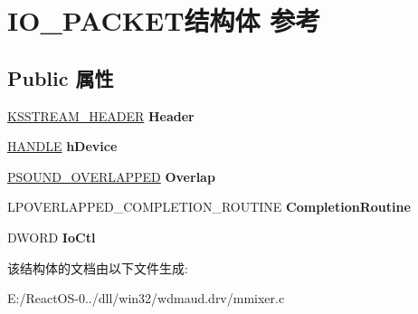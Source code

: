 \hypertarget{struct_i_o___p_a_c_k_e_t}{}\section{I\+O\+\_\+\+P\+A\+C\+K\+E\+T结构体 参考}
\label{struct_i_o___p_a_c_k_e_t}
\subsection*{Public 属性}
\begin{DoxyCompactItemize}
\item 
\mbox{\label{struct_i_o___p_a_c_k_e_t_a23caf1ce67d13972c6a9f560380cafda}} 
\hyperlink{struct_k_s_s_t_r_e_a_m___h_e_a_d_e_r}{K\+S\+S\+T\+R\+E\+A\+M\+\_\+\+H\+E\+A\+D\+ER} {\bfseries Header}
\item 
\mbox{\label{struct_i_o___p_a_c_k_e_t_adc99eabee6f837022c012760d936e987}} 
\hyperlink{interfacevoid}{H\+A\+N\+D\+LE} {\bfseries h\+Device}
\item 
\mbox{\label{struct_i_o___p_a_c_k_e_t_a8a1658598c874e3c382389cec48521f5}} 
\hyperlink{struct___s_o_u_n_d___o_v_e_r_l_a_p_p_e_d}{P\+S\+O\+U\+N\+D\+\_\+\+O\+V\+E\+R\+L\+A\+P\+P\+ED} {\bfseries Overlap}
\item 
\mbox{\label{struct_i_o___p_a_c_k_e_t_a98625b87253b42435862f7542ccb068c}} 
L\+P\+O\+V\+E\+R\+L\+A\+P\+P\+E\+D\+\_\+\+C\+O\+M\+P\+L\+E\+T\+I\+O\+N\+\_\+\+R\+O\+U\+T\+I\+NE {\bfseries Completion\+Routine}
\item 
\mbox{\label{struct_i_o___p_a_c_k_e_t_a00439e8ca78fd3a1f550721e1238864a}} 
D\+W\+O\+RD {\bfseries Io\+Ctl}
\end{DoxyCompactItemize}


该结构体的文档由以下文件生成\+:\begin{DoxyCompactItemize}
\item 
E\+:/\+React\+O\+S-\/0../dll/win32/wdmaud.\+drv/mmixer.\+c\end{DoxyCompactItemize}
